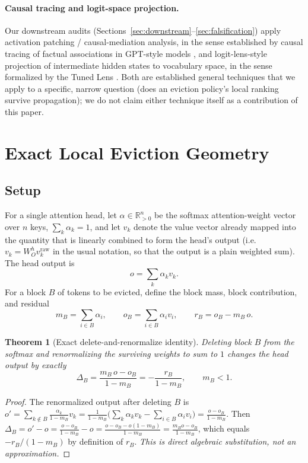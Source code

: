 \documentclass[11pt]{article}
\newtheorem{theorem}{Theorem}
\begin{document}
\paragraph{Causal tracing and logit-space projection.} Our downstream
audits (Sections~\ref{sec:downstream}--\ref{sec:falsification}) apply
activation patching / causal-mediation analysis, in the sense established by
causal tracing of factual associations in GPT-style models
\cite{rome2022}, and logit-lens-style projection of intermediate hidden
states to vocabulary space, in the sense formalized by the Tuned Lens
\cite{tunedlens2023}. Both are established general techniques that we apply
to a specific, narrow question (does an eviction policy's local ranking
survive propagation); we do not claim either technique itself as a
contribution of this paper.

\section{Exact Local Eviction Geometry}
\label{sec:localgeometry}

\subsection{Setup}

For a single attention head, let $\alpha \in \mathbb{R}^n_{>0}$ be the
softmax attention-weight vector over $n$ keys, $\sum_k \alpha_k = 1$, and let
$v_k$ denote the value vector already mapped into the quantity that is
linearly combined to form the head's output (i.e.\ $v_k = W_O^h v_k^{\text{raw}}$
in the usual notation, so that the output is a plain weighted sum). The head
output is
\[
o = \sum_k \alpha_k v_k .
\]
For a block $B$ of tokens to be evicted, define the block mass, block
contribution, and residual
\[
m_B = \sum_{i \in B} \alpha_i, \qquad
o_B = \sum_{i \in B} \alpha_i v_i, \qquad
r_B = o_B - m_B \, o .
\]

\begin{theorem}[Exact delete-and-renormalize identity]
\label{thm:delta}
Deleting block $B$ from the softmax and renormalizing the surviving weights
to sum to $1$ changes the head output by exactly
\[
\Delta_B = \frac{m_B \, o - o_B}{1 - m_B} = -\frac{r_B}{1-m_B}, \qquad m_B < 1 .
\]
\end{theorem}

\begin{proof}
The renormalized output after deleting $B$ is
$o' = \sum_{k \notin B} \frac{\alpha_k}{1-m_B} v_k
= \frac{1}{1-m_B}\Big( \sum_k \alpha_k v_k - \sum_{i\in B} \alpha_i v_i \Big)
= \frac{o - o_B}{1-m_B}$.
Then $\Delta_B = o' - o = \frac{o - o_B}{1-m_B} - o = \frac{o - o_B - o(1-m_B)}{1-m_B}
= \frac{m_B o - o_B}{1-m_B}$, which equals $-r_B/(1-m_B)$ by definition of
$r_B$. \emph{This is direct algebraic substitution, not an approximation.}
\end{proof}
\end{document}
